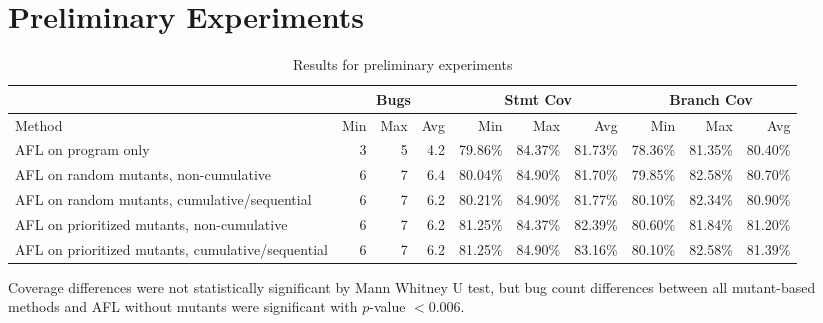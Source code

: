 \section{Preliminary Experiments}

\begin{table*}
  \begin{centering}
  \begin{tabular}{l||r|r|r||r|r|r||r|r|r}
    & \multicolumn{3}{|c||}{Bugs} & \multicolumn{3}{|c||}{Stmt Cov} &
                                                                    \multicolumn{3}{|c}{Branch Cov} \\
    \hline
  Method & Min & Max  & Avg & Min & Max & Avg
                                                                  
  & Min & Max & Avg \\
  \hline
  AFL on program only & 3 & 5 & 4.2 & 79.86\% & 84.37\% & 81.73\% &
                                                                    78.36\%
                                  & 81.35\% & 80.40\%\\
  \hline
  AFL on random mutants, non-cumulative  & 6 & 7 & 6.4 & 80.04\% &
                                                                   84.90\%
                      & 81.70\% & 79.85\% & 82.58\% & 80.70\%\\
  \hline
  AFL on random mutants, cumulative/sequential & 6 & 7 & 6.2 & 80.21\%
                                                               &
                                                                 84.90\%
                      & 81.77\%
                            & 80.10\% & 82.34\% & 80.90\%\\
    \hline
    AFL on prioritized mutants, non-cumulative  & 6 & 7 & 6.2 &
                                                                81.25\%
               & 84.37\% & 82.39\% & 80.60\% & 81.84\% & 81.20\% \\
    \hline
    AFL on prioritized mutants, cumulative/sequential  & 6 & 7 & 6.2 &
    81.25\% & 84.90\% & 83.16\% & 80.10\% & 82.58\% & 81.39\%\\    
  \hline
  \end{tabular}
  \end{centering}
\caption{Results for preliminary experiments}
\end{table*}

Coverage differences were not statistically significant by Mann
Whitney U test, but bug count differences between all mutant-based methods and AFL
without mutants were significant with $p$-value $< 0.006$.
